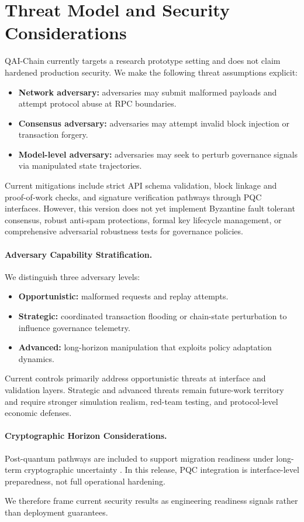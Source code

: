 \section{Threat Model and Security Considerations}

QAI-Chain currently targets a research prototype setting and does not claim hardened production security. We make the following threat assumptions explicit:

\begin{itemize}
    \item \textbf{Network adversary:} adversaries may submit malformed payloads and attempt protocol abuse at RPC boundaries.
    \item \textbf{Consensus adversary:} adversaries may attempt invalid block injection or transaction forgery.
    \item \textbf{Model-level adversary:} adversaries may seek to perturb governance signals via manipulated state trajectories.
\end{itemize}

Current mitigations include strict API schema validation, block linkage and proof-of-work checks, and signature verification pathways through PQC interfaces. However, this version does not yet implement Byzantine fault tolerant consensus, robust anti-spam protections, formal key lifecycle management, or comprehensive adversarial robustness tests for governance policies.

\paragraph{Adversary Capability Stratification.}
We distinguish three adversary levels:
\begin{itemize}
    \item \textbf{Opportunistic:} malformed requests and replay attempts.
    \item \textbf{Strategic:} coordinated transaction flooding or chain-state perturbation to influence governance telemetry.
    \item \textbf{Advanced:} long-horizon manipulation that exploits policy adaptation dynamics.
\end{itemize}

Current controls primarily address opportunistic threats at interface and validation layers. Strategic and advanced threats remain future-work territory and require stronger simulation realism, red-team testing, and protocol-level economic defenses.

\paragraph{Cryptographic Horizon Considerations.}
Post-quantum pathways are included to support migration readiness under long-term cryptographic uncertainty \citep{shor1999polynomial,nistpqc2024}. In this release, PQC integration is interface-level preparedness, not full operational hardening.

We therefore frame current security results as engineering readiness signals rather than deployment guarantees.